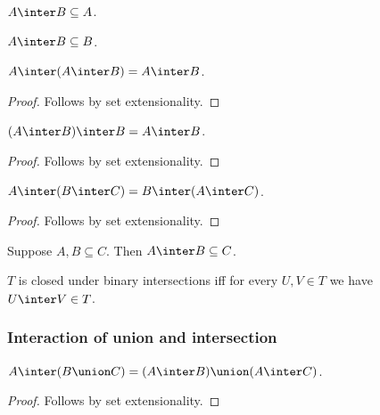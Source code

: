 \begin{proposition}%
\label{inter_lower_left}
    $A\inter B \subseteq A$.
\end{proposition}

\begin{proposition}%
\label{inter_lower_right}
    $A\inter B \subseteq B$.
\end{proposition}

\begin{proposition}\label{inter_absorb_left}
    $A\inter (A\inter B) = A\inter B$.
\end{proposition}
\begin{proof} Follows by set extensionality. \end{proof}

\begin{proposition}%
\label{inter_absorb_right}
    $(A\inter B) \inter B = A\inter B$.
\end{proposition}
\begin{proof} Follows by set extensionality. \end{proof}

\begin{proposition}\label{inter_comm_left}
    $A\inter (B\inter C) = B\inter (A\inter C)$.
\end{proposition}
\begin{proof}
    Follows by set extensionality.
\end{proof}

\begin{proposition}\label{inter_subseteq}
    Suppose $A,B\subseteq C$.
    Then $A\inter B\subseteq C$.
\end{proposition}

\begin{abbreviation}\label{closedunderinter}
    $T$ is closed under binary intersections
    iff for every $U,V\in T$ we have $U\inter V\in T$.
\end{abbreviation}

\subsubsection{Interaction of union and intersection}

\begin{proposition}%
\label{inter_distrib_union}
    $A\inter (B\union C) = (A\inter B)\union (A\inter C)$.
\end{proposition}
\begin{proof}
    Follows by set extensionality.
\end{proof}

